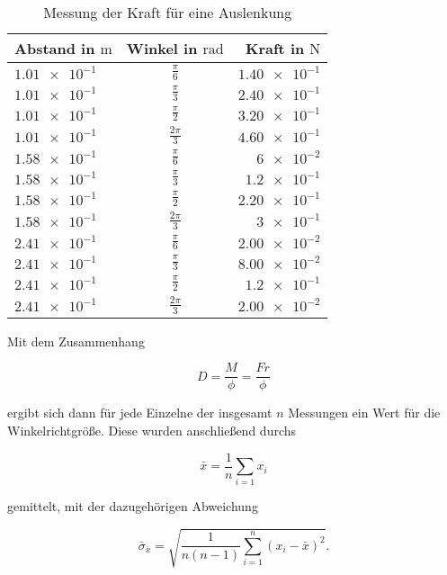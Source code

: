\begin{table}
\centering
\caption{Messung der Kraft für eine Auslenkung}
\label{tab: winkelricht}
\renewcommand{\arraystretch}{1.2}
\begin{tabular}{lcr}
	\toprule
	Abstand in $\si{\meter}$ & Winkel in $\mathrm{rad}$ & Kraft in $\si{\newton}$ \\
	\midrule
	$\num{1.01e-1}$ & $\frac{\pi}{6}$ & $\num{1.40e-1}$ \\
	$\num{1.01e-1}$ & $\frac{\pi}{3}$ & $\num{2.40e-1}$ \\
	$\num{1.01e-1}$ & $\frac{\pi}{2}$ & $\num{3.20e-1}$ \\
	$\num{1.01e-1}$ & $\frac{2\pi}{3}$ & $\num{4.60e-1}$ \\
	$\num{1.58e-1}$ & $\frac{\pi}{6}$ & $\num{6e-2}$ \\
	$\num{1.58e-1}$ & $\frac{\pi}{3}$ & $\num{1.2e-1}$ \\
	$\num{1.58e-1}$ & $\frac{\pi}{2}$ & $\num{2.20e-1}$ \\
	$\num{1.58e-1}$ & $\frac{2\pi}{3}$ & $\num{3e-1}$ \\
	$\num{2.41e-1}$ & $\frac{\pi}{6}$ & $\num{2.00e-2}$ \\
	$\num{2.41e-1}$ & $\frac{\pi}{3}$ & $\num{8.00e-2}$ \\
	$\num{2.41e-1}$ & $\frac{\pi}{2}$ & $\num{1.2e-1}$ \\
	$\num{2.41e-1}$ & $\frac{2\pi}{3}$ & $\num{2.00e-2}$ \\
	\bottomrule
\end{tabular}
\end{table}

Mit dem Zusammenhang

\begin{equation*}
D=\frac{M}{\phi}=\frac{Fr}{\phi}
\end{equation*}

ergibt sich dann für jede Einzelne der insgesamt $n$ Messungen ein Wert für die Winkelrichtgröße.
Diese wurden anschließend durchs

\begin{equation}
\label{eq:mittel}
\bar{x}=\frac{1}{n}\sum_{i=1}x_i
\end{equation}

gemittelt, mit der dazugehörigen Abweichung

\begin{equation}
\label{eq:stand_ab}
\bar{\sigma}_{\bar{x}}=\sqrt{\frac{1}{n(n-1)}\sum_{i=1}^{n}(x_i-\bar{x})^2}.
\end{equation}

